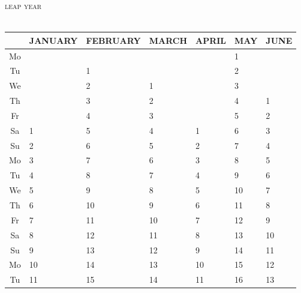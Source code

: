 \documentclass[a4paper]{article}
\def\January{JANUARY}
\def\February{FEBRUARY}
\def\March{MARCH}
\def\April{APRIL}
\def\May{MAY}
\def\June{JUNE}
\def\Mo{Mo}
\def\Tu{Tu}
\def\We{We}
\def\Th{Th}
\def\Fr{Fr}
\def\Sa{Sa}
\def\Su{Su}
\def\leapyear{\textsc{leap year}}
\newcommand{\monthstrut}{\rule{0pt}{12pt}}
\newcommand{\datestrut}{\rule{0pt}{12pt}}
\begin{document}
\thispagestyle{empty}
\begin{table}
\hspace{1cm}{\LARGE 2000}\hspace{8mm}\leapyear\\
{\ } \\
\begin{tabular}{|c||p{2.5cm}|p{2.5cm}|p{2.5cm}|p{2.5cm}|p{2.5cm}|p{2.5cm}|}
\hline
   \multicolumn{1}{|c||}{\monthstrut} &
   \multicolumn{1}{|c|}{\January} &
   \multicolumn{1}{|c|}{\February} &
   \multicolumn{1}{|c|}{\March} &
   \multicolumn{1}{|c|}{\April} &
   \multicolumn{1}{|c|}{\May} &
   \multicolumn{1}{|c|}{\June} \\
\hline
\hline
\datestrut \Mo &     &     &     &     & 1     &       \\
\cline{1-1}\cline{3-3}\cline{6-6}
\datestrut \Tu &     &1    &     &     & 2     &       \\
\cline{1-1}\cline{3-4}\cline{6-6}
\datestrut \We &     &2    & 1   &     & 3     &       \\
\cline{1-1}\cline{3-4}\cline{6-7}
\datestrut \Th &     &3    & 2   &     & 4     & 1     \\
\cline{1-1}\cline{3-4}\cline{6-7}
\datestrut \Fr &     &4    & 3   &     & 5     & 2     \\
\hline
\datestrut \Sa & 1   &5    & 4   & 1   & 6     & 3     \\
\hline
\datestrut \Su & 2   &6    & 5   & 2   & 7     & 4     \\
\hline\hline
\datestrut \Mo & 3   &7    & 6   & 3   & 8     & 5     \\
\hline
\datestrut \Tu & 4   &8    & 7   & 4   & 9     & 6     \\
\hline
\datestrut \We & 5   &9    & 8   & 5   & 10    & 7     \\
\hline
\datestrut \Th & 6   &10   & 9   & 6   & 11    & 8     \\
\hline
\datestrut \Fr & 7   &11   & 10  & 7   & 12    & 9     \\
\hline
\datestrut \Sa & 8   &12   & 11  & 8   & 13    & 10    \\
\hline
\datestrut \Su & 9   &13   & 12  & 9   & 14    & 11    \\
\hline \hline
\datestrut \Mo & 10  &14   & 13  & 10  & 15    & 12    \\
\hline
\datestrut \Tu & 11  &15   & 14  & 11  & 16    & 13    \\

\end{tabular}
\end{table}
\end{document}

